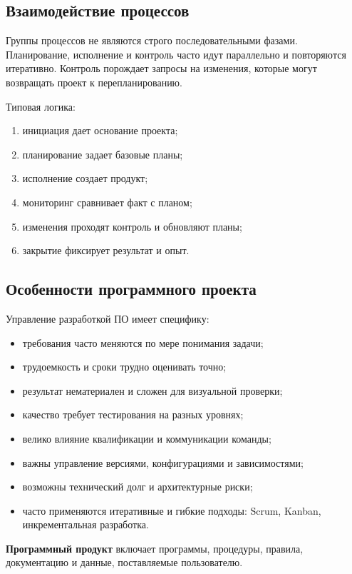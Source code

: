 \subsection*{Взаимодействие процессов}

Группы процессов не являются строго последовательными фазами. Планирование, исполнение и контроль часто идут параллельно и повторяются итеративно. Контроль порождает запросы на изменения, которые могут возвращать проект к перепланированию.

Типовая логика:
\begin{enumerate}
    \item инициация дает основание проекта;
    \item планирование задает базовые планы;
    \item исполнение создает продукт;
    \item мониторинг сравнивает факт с планом;
    \item изменения проходят контроль и обновляют планы;
    \item закрытие фиксирует результат и опыт.
\end{enumerate}

\subsection*{Особенности программного проекта}

Управление разработкой ПО имеет специфику:
\begin{itemize}
    \item требования часто меняются по мере понимания задачи;
    \item трудоемкость и сроки трудно оценивать точно;
    \item результат нематериален и сложен для визуальной проверки;
    \item качество требует тестирования на разных уровнях;
    \item велико влияние квалификации и коммуникации команды;
    \item важны управление версиями, конфигурациями и зависимостями;
    \item возможны технический долг и архитектурные риски;
    \item часто применяются итеративные и гибкие подходы: Scrum, Kanban, инкрементальная разработка.
\end{itemize}

\textbf{Программный продукт} включает программы, процедуры, правила, документацию и данные, поставляемые пользователю.

